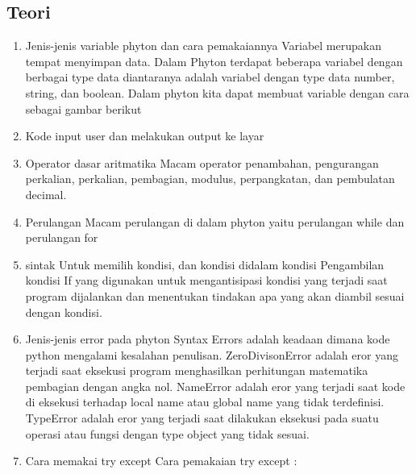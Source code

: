 \begin{enumerate}
\subsection{Teori}
\begin{enumerate}
	\item Jenis-jenis variable phyton dan cara pemakaiannya
Variabel merupakan tempat menyimpan data. Dalam Phyton terdapat beberapa variabel dengan berbagai type data diantaranya adalah variabel dengan type data number, string, dan boolean. Dalam phyton kita dapat membuat variable dengan cara sebagai gambar berikut
   
	\item Kode input user dan melakukan output ke layar
 
	\item Operator dasar aritmatika
Macam operator penambahan, pengurangan perkalian, perkalian, pembagian, modulus, perpangkatan, dan pembulatan decimal.

	\item Perulangan
Macam perulangan di dalam phyton yaitu perulangan while dan perulangan for
 
 
	\item sintak Untuk memilih kondisi, dan kondisi didalam kondisi
Pengambilan kondisi If yang digunakan untuk mengantisipasi kondisi yang terjadi saat program dijalankan dan menentukan tindakan apa yang akan diambil sesuai dengan kondisi.
  
  
  

	\item Jenis-jenis error pada phyton
Syntax Errors adalah keadaan dimana kode python mengalami kesalahan penulisan. 
ZeroDivisonError adalah eror yang terjadi saat eksekusi program menghasilkan perhitungan matematika pembagian dengan angka nol.
NameError adalah eror yang terjadi saat kode di eksekusi terhadap local name atau global name yang tidak terdefinisi. 
TypeError adalah eror yang terjadi saat dilakukan eksekusi pada suatu operasi atau fungsi dengan type object yang tidak sesuai.

	\item Cara memakai try except
Cara pemakaian try except :



\end{enumerate}
\end{enumerate}
